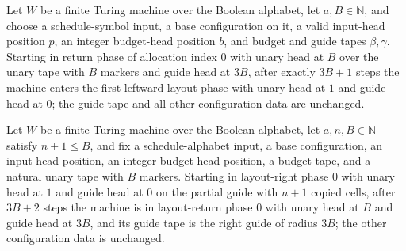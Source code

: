 \begin{lemma}
\label{Complexity.setupCfg_layout_return}
\leanok
{}
Let $W$ be a finite Turing machine over the Boolean alphabet, let $a,B\in\mathbb{N}$,
and choose a schedule-symbol input, a base configuration on it, a valid input-head
position $p$, an integer budget-head position $b$, and budget and guide tapes
$\beta,\gamma$. Starting in return phase of allocation index $0$ with unary head at $B$
over the unary tape with $B$ markers and guide head at $3B$, after exactly $3B+1$ steps
the machine enters the first leftward layout phase with unary head at $1$ and guide head
at $0$; the guide tape and all other configuration data are unchanged.
\end{lemma}

\begin{lemma}
\label{Complexity.setupCfg_layout_right}
\leanok
{}
Let $W$ be a finite Turing machine over the Boolean alphabet, let $a,n,B\in\mathbb{N}$
satisfy $n+1\le B$, and fix a schedule-alphabet input, a base configuration, an
input-head position, an integer budget-head position, a budget tape, and a natural unary
tape with $B$ markers. Starting in layout-right phase $0$ with unary head at $1$ and
guide head at $0$ on the partial guide with $n+1$ copied cells, after $3B+2$ steps the
machine is in layout-return phase $0$ with unary head at $B$ and guide head at $3B$, and
its guide tape is the right guide of radius $3B$; the other configuration data is
unchanged.
\end{lemma}

